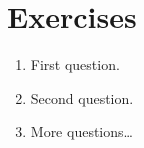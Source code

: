 \section{Exercises}
\begin{enumerate}
	\item First question.
	\item Second question.
	\item More questions\ldots
\end{enumerate}
